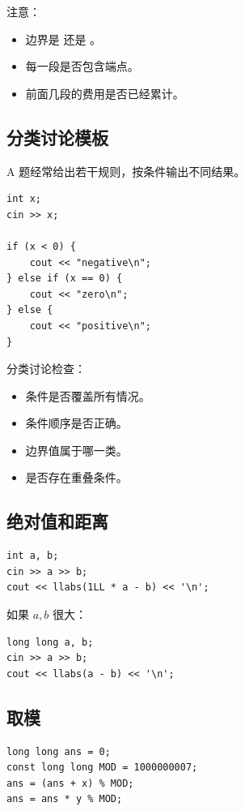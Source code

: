 注意：

\begin{itemize}
  \item 边界是 \Code{<=} 还是 \Code{<}。
  \item 每一段是否包含端点。
  \item 前面几段的费用是否已经累计。
\end{itemize}

\subsection{分类讨论模板}

A 题经常给出若干规则，按条件输出不同结果。

\begin{lstlisting}
int x;
cin >> x;

if (x < 0) {
    cout << "negative\n";
} else if (x == 0) {
    cout << "zero\n";
} else {
    cout << "positive\n";
}
\end{lstlisting}

分类讨论检查：

\begin{itemize}
  \item 条件是否覆盖所有情况。
  \item 条件顺序是否正确。
  \item 边界值属于哪一类。
  \item 是否存在重叠条件。
\end{itemize}

\subsection{绝对值和距离}

\begin{lstlisting}
int a, b;
cin >> a >> b;
cout << llabs(1LL * a - b) << '\n';
\end{lstlisting}

如果 $a,b$ 很大：

\begin{lstlisting}
long long a, b;
cin >> a >> b;
cout << llabs(a - b) << '\n';
\end{lstlisting}

\subsection{取模}

\begin{lstlisting}
long long ans = 0;
const long long MOD = 1000000007;
ans = (ans + x) % MOD;
ans = ans * y % MOD;
\end{lstlisting}

